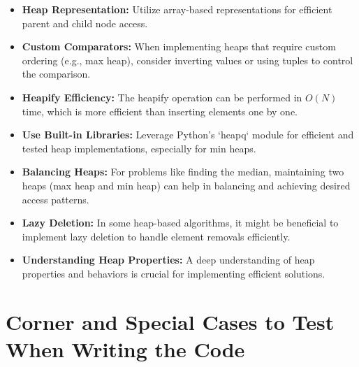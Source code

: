 \begin{itemize}
    \item \textbf{Heap Representation:} Utilize array-based representations for efficient parent and child node access.
    
    \item \textbf{Custom Comparators:} When implementing heaps that require custom ordering (e.g., max heap), consider inverting values or using tuples to control the comparison.
    
    \item \textbf{Heapify Efficiency:} The heapify operation can be performed in \( O(N) \) time, which is more efficient than inserting elements one by one.
    
    \item \textbf{Use Built-in Libraries:} Leverage Python's `heapq` module for efficient and tested heap implementations, especially for min heaps.
    
    \item \textbf{Balancing Heaps:} For problems like finding the median, maintaining two heaps (max heap and min heap) can help in balancing and achieving desired access patterns.
    
    \item \textbf{Lazy Deletion:} In some heap-based algorithms, it might be beneficial to implement lazy deletion to handle element removals efficiently.
    
    \item \textbf{Understanding Heap Properties:} A deep understanding of heap properties and behaviors is crucial for implementing efficient solutions.
\end{itemize}

\section*{Corner and Special Cases to Test When Writing the Code}

